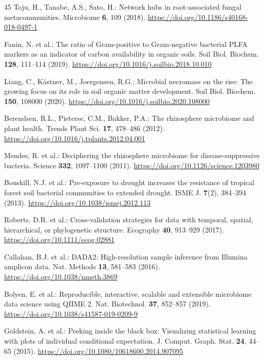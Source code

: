 \documentclass[runningheads,a4paper,oribibl]{llncs}
\begin{document}
\begin{thebibliography}{45}
Toju, H., Tanabe, A.S., Sato, H.: Network hubs in root-associated fungal metacommunities. Microbiome \textbf{6}, 109 (2018). \url{https://doi.org/10.1186/s40168-018-0497-1}

Fanin, N. et al.: The ratio of Gram-positive to Gram-negative bacterial PLFA markers as an indicator of carbon availability in organic soils. Soil Biol. Biochem. \textbf{128}, 111--114 (2019). \url{https://doi.org/10.1016/j.soilbio.2018.10.010}

Liang, C., Kästner, M., Joergensen, R.G.: Microbial necromass on the rise: The growing focus on its role in soil organic matter development. Soil Biol. Biochem. \textbf{150}, 108000 (2020). \url{https://doi.org/10.1016/j.soilbio.2020.108000}

Berendsen, R.L., Pieterse, C.M., Bakker, P.A.: The rhizosphere microbiome and plant health. Trends Plant Sci. \textbf{17}, 478--486 (2012). \url{https://doi.org/10.1016/j.tplants.2012.04.001}

Mendes, R. et al.: Deciphering the rhizosphere microbiome for disease-suppressive bacteria. Science \textbf{332}, 1097--1100 (2011). \url{https://doi.org/10.1126/science.1203980}

Bouskill, N.J. et al.: Pre-exposure to drought increases the resistance of tropical forest soil bacterial communities to extended drought. ISME J. \textbf{7}(2), 384--394 (2013). \url{https://doi.org/10.1038/ismej.2012.113}

Roberts, D.R. et al.: Cross-validation strategies for data with temporal, spatial, hierarchical, or phylogenetic structure. Ecography \textbf{40}, 913--929 (2017). \url{https://doi.org/10.1111/ecog.02881}

Callahan, B.J. et al.: DADA2: High-resolution sample inference from Illumina amplicon data. Nat. Methods \textbf{13}, 581--583 (2016). \url{https://doi.org/10.1038/nmeth.3869}

Bolyen, E. et al.: Reproducible, interactive, scalable and extensible microbiome data science using QIIME 2. Nat. Biotechnol. \textbf{37}, 852--857 (2019). \url{https://doi.org/10.1038/s41587-019-0209-9}

Goldstein, A. et al.: Peeking inside the black box: Visualizing statistical learning with plots of individual conditional expectation. J. Comput. Graph. Stat. \textbf{24}, 44--65 (2015). \url{https://doi.org/10.1080/10618600.2014.907095}


\end{thebibliography}
\end{document}
